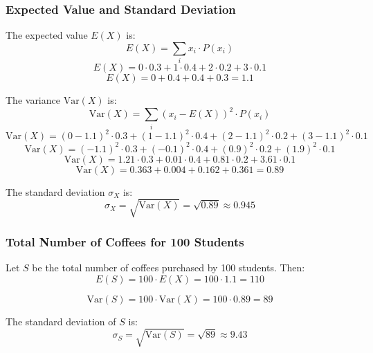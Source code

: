 \documentclass{article}
\begin{document}
\subsubsection*{Expected Value and Standard Deviation}

The expected value \(E(X)\) is:
\[
E(X) = \sum_{i} x_i \cdot P(x_i)
\]
\[
E(X) = 0 \cdot 0.3 + 1 \cdot 0.4 + 2 \cdot 0.2 + 3 \cdot 0.1
\]
\[
E(X) = 0 + 0.4 + 0.4 + 0.3 = 1.1
\]

The variance \(\text{Var}(X)\) is:
\[
\text{Var}(X) = \sum_{i} (x_i - E(X))^2 \cdot P(x_i)
\]
\[
\text{Var}(X) = (0 - 1.1)^2 \cdot 0.3 + (1 - 1.1)^2 \cdot 0.4 + (2 - 1.1)^2 \cdot 0.2 + (3 - 1.1)^2 \cdot 0.1
\]
\[
\text{Var}(X) = (-1.1)^2 \cdot 0.3 + (-0.1)^2 \cdot 0.4 + (0.9)^2 \cdot 0.2 + (1.9)^2 \cdot 0.1
\]
\[
\text{Var}(X) = 1.21 \cdot 0.3 + 0.01 \cdot 0.4 + 0.81 \cdot 0.2 + 3.61 \cdot 0.1
\]
\[
\text{Var}(X) = 0.363 + 0.004 + 0.162 + 0.361 = 0.89
\]

The standard deviation \(\sigma_X\) is:
\[
\sigma_X = \sqrt{\text{Var}(X)} = \sqrt{0.89} \approx 0.945
\]

\subsubsection*{Total Number of Coffees for 100 Students}

Let \(S\) be the total number of coffees purchased by 100 students. Then:
\[
E(S) = 100 \cdot E(X) = 100 \cdot 1.1 = 110
\]

\[
\text{Var}(S) = 100 \cdot \text{Var}(X) = 100 \cdot 0.89 = 89
\]

The standard deviation of \(S\) is:
\[
\sigma_S = \sqrt{\text{Var}(S)} = \sqrt{89} \approx 9.43
\]
\end{document}
